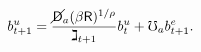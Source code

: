 \begin{equation*}
b^{u}_{t+1}=\frac{\cancel{\mathsf{D}}_a(\beta \mathsf{R})^{1/\rho}}{\gimel_{t+1}} b^{u}_t + \mho_a b^{e}_{t+1}.
\end{equation*}
